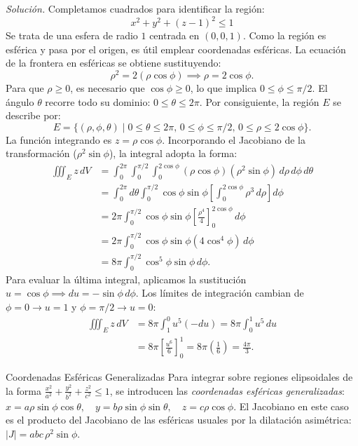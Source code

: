 \documentclass[11pt,a4paper]{article}
\begin{document}
\textit{Solución.} Completamos cuadrados para identificar la región:
\[
x^2 + y^2 + (z-1)^2 \leq 1
\]
Se trata de una esfera de radio $1$ centrada en $(0,0,1)$. Como la región es esférica y pasa por el origen, es útil emplear coordenadas esféricas.
La ecuación de la frontera en esféricas se obtiene sustituyendo:
\[
\rho^2 = 2(\rho \cos\phi) \implies \rho = 2\cos\phi.
\]
Para que $\rho \geq 0$, es necesario que $\cos\phi \geq 0$, lo que implica $0 \leq \phi \leq \pi/2$. El ángulo $\theta$ recorre todo su dominio: $0 \leq \theta \leq 2\pi$. Por consiguiente, la región $E$ se describe por:
\[
E = \{(\rho, \phi, \theta) \mid 0 \leq \theta \leq 2\pi, \, 0 \leq \phi \leq \pi/2, \, 0 \leq \rho \leq 2\cos\phi\}.
\]
La función integrando es $z = \rho \cos\phi$. Incorporando el Jacobiano de la transformación ($\rho^2 \sin\phi$), la integral adopta la forma:
\begin{align*}
\iiint_{E} z \, dV &= \int_0^{2\pi} \int_0^{\pi/2} \int_0^{2\cos\phi} (\rho \cos\phi) (\rho^2 \sin\phi) \, d\rho \, d\phi \, d\theta \\
&= \int_0^{2\pi} d\theta \int_0^{\pi/2} \cos\phi \sin\phi \left[ \int_0^{2\cos\phi} \rho^3 \, d\rho \right] d\phi \\
&= 2\pi \int_0^{\pi/2} \cos\phi \sin\phi \left[ \frac{\rho^4}{4} \right]_0^{2\cos\phi} \, d\phi \\
&= 2\pi \int_0^{\pi/2} \cos\phi \sin\phi \left( 4\cos^4\phi \right) \, d\phi \\
&= 8\pi \int_0^{\pi/2} \cos^5\phi \sin\phi \, d\phi.
\end{align*}
Para evaluar la última integral, aplicamos la sustitución $u = \cos\phi \implies du = -\sin\phi \, d\phi$. Los límites de integración cambian de $\phi=0 \to u=1$ y $\phi=\pi/2 \to u=0$:
\begin{align*}
\iiint_{E} z \, dV &= 8\pi \int_1^0 u^5 (-du) = 8\pi \int_0^1 u^5 \, du \\
&= 8\pi \left[ \frac{u^6}{6} \right]_0^1 = 8\pi \left( \frac{1}{6} \right) = \frac{4\pi}{3}.
\end{align*}

\begin{observacionbox}{Coordenadas Esféricas Generalizadas}{}
    Para integrar sobre regiones elipsoidales de la forma $\frac{x^2}{a^2} + \frac{y^2}{b^2} + \frac{z^2}{c^2} \leq 1$, se introducen las \emph{coordenadas esféricas generalizadas}:
    $x = a \rho \sin\phi \cos\theta, \quad y = b \rho \sin\phi \sin\theta, \quad z = c \rho \cos\phi$.
    El Jacobiano en este caso es el producto del Jacobiano de las esféricas usuales por la dilatación asimétrica: $|J| = a b c \, \rho^2 \sin\phi$.
\end{observacionbox}
\end{document}
